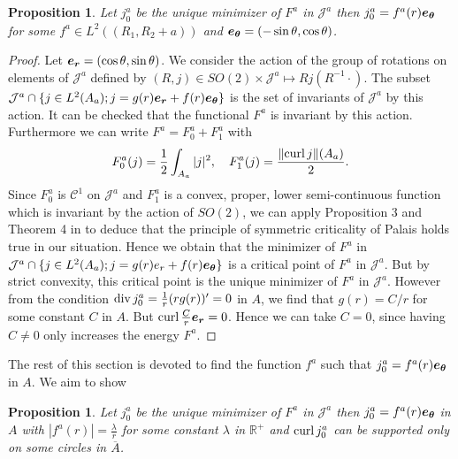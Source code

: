 \documentclass[12pt,reqno]{amsart}
\newtheorem{proposition}[theorem]{Proposition}
\def\C{{\mathcal C}}
\renewcommand{\vec}[1]{\text{\boldmath $#1$}}
\def\curl{{\rm curl\,}}
\def \J {{\mathcal J}}
\newcommand{\R}{\mathbb{R}}
\DeclareMathOperator \dive{\rm {div}}
\numberwithin{equation}{section}
\begin{document}
\begin{proposition}\label{prop:jmin_radial}
Let \(j_0^a\) be the unique minimizer of \(F^a\) in \(\J^a\) then \(j_0^a=f^a(r) \vec{e_\theta}\) for some \(f^a\in L^2((R_1,R_2+a))\) and \(\vec{e_\theta}=(-\sin \theta, \cos \theta)\).
\end{proposition}

\begin{proof}
Let \(\vec{e_r}=(\cos \theta,\sin \theta)\).  We consider the action of the group of rotations on elements of \(\mathcal{J}^a\) defined by \((R,j)\in SO(2)\times \mathcal{J}^a \mapsto R j(R^{-1}\cdot)\). The subset \(\J^a\cap \{j \in L^2(A_a); j=g(r)\vec{e_r}+f(r) \vec{e_\theta}\}\) is the set of invariants of \(\J^a\) by this action. It can be checked that the functional \(F^a\) is invariant by this action. Furthermore we can write \( F^a=F_0^a+F_1^a\) with
\begin{equation*}
F_0^a(j)=\frac{1}{2}\int_{A_a} |j|^2, \quad F_1^a(j)=\frac{\|\curl j\|(A_a)}{2}.
\end{equation*}
Since \(F_0^a\) is \(\C^1\) on \(\mathcal{J}^a\) and \(F_1^a\) is a convex, proper, lower semi-continuous function which is invariant by the action of \(SO(2)\), we can apply Proposition 3 and Theorem 4 in  \cite{Squassina_2011} to deduce that the principle of symmetric criticality  of Palais holds true in our situation. Hence we obtain that the minimizer of \(F^a\) in \(\J^a \cap \{j \in L^2(A_a); j=g(r)e_r+f(r) \vec{e_\theta}\}\) is a critical point of \(F^a\) in \(\J^a\). But by strict convexity, this critical point is the unique minimizer of \(F^a\) in \(\J^a\).
However from the condition \(\dive j_0^a= \frac{1}{r}(rg(r))'=0\) in \(A\), we find that \(g(r)=C/r\) for some constant \(C\) in \(A\). But \(\curl \frac{C}{r}\vec{e_r} =0\). Hence we can take \(C=0\), since having \(C\neq 0\) only increases the energy \(F^a\).
\end{proof}

The rest of this section is devoted to find the function \(f^a\) such that \(j_0^a=f^a(r)\vec{e_\theta}\) in \(A\). We aim to show

\begin{proposition}\label{prop:explicit_j}
Let \(j_0^a\) be the unique minimizer of \(F^a\) in \(\J^a\) then \(j_0^a=f^a(r) \vec{e_\theta}\) in \(A\) with \(|f^a(r)|=\frac{\lambda}{r}\) for some constant \(\lambda\) in  \(\R^+\) and \(\curl j_0^a\) can be supported only on some circles in \(\overline{A}\).
\end{proposition}
\end{document}
